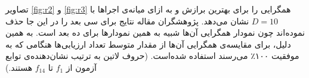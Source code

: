 \documentclass[12pt,a4paper]{article}
\theoremstyle{definition}
\theoremstyle{theorem}
\theoremstyle{definition}
\begin{document}
تصاویر \ref{fig:r2} و \ref{fig:r3} همگرایی را برای بهترین برازش و به ازای میانه‌ی اجراها با 
$D=10$
نشان می‌دهد. پژوهشگران مقاله نتایج برای سی‌ بعد را در این جا حذف نموده‌اند چون نمودار همگرایی آن‌ها شبیه به همین نمودارها برای ده بعد است. به همین دلیل، برای مقایسه‌ی همگرایی آن‌ها از مقدار متوسط تعداد ارزیابی‌ها هنگامی که به موفقیت ۱۰۰٪ می‌رسند استفاده شده‌است.
(حروف لاتین به ترتیب نشان‌دهنده‌ی توابع آزمون از 
$f_1$
تا 
$f_{14}$
هستند.)
\begin{figure}
\noindent{}
\end{figure}
\end{document}
